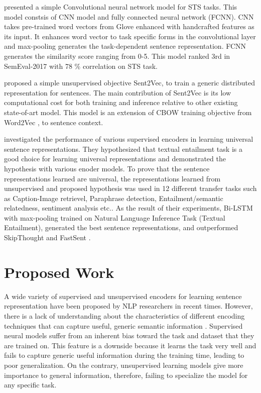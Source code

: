 \documentclass[12pt]{report} %
\begin{document}
\cite{shao2017hcti} presented a simple Convolutional neural network model for STS tasks. This model constsis of CNN model and fully connected neural network (FCNN). CNN takes pre-trained word vectors from Glove \cite{pennington2014glove} enhanced with handcrafted features as its input. It enhances word vector to task specific forms in the convolutional layer and max-pooling generates the task-dependent sentence representation. FCNN generates the similarity score ranging from 0-5. This model ranked 3rd in SemEval-2017 with 78 \% correlation on STS task. 


\cite{pagliardini2017unsupervised} proposed a simple unsupervised objective Sent2Vec, to train a generic distributed representation for sentences. The main contribution of Sent2Vec is its low computational cost for both training and inference relative to other existing state-of-art model. This model is an extension of CBOW training objective from Word2Vec \citep{mikolov2014word2vec}, to sentence context.


\cite{conneau2017supervised} investigated the performance of various supervised encoders in learning universal sentence representations. They hypothesized that textual entailment task is a good choice for learning universal representations and demonstrated the hypothesis with various enoder models. To prove that the sentence representations learned are universal, the representations learned from unsupervised and proposed hypothesis was used in 12 different transfer tasks such as Caption-Image retrievel, Paraphrase detection, Entailment/semantic relatedness, sentiment analysis etc.. As the result of their experiments, Bi-LSTM with max-pooling trained on Natural Language Inference Task (Textual Entailment), generated the best sentence representations, and outperformed SkipThought \cite{kiros2015skip} and FastSent \cite{hill2016learning}.

\chapter{Proposed Work}

A wide variety of supervised and unsupervised encoders for learning sentence representation have been proposed by NLP researchers in recent times. However, there is a lack of understanding about the characteristics of different encoding techniques that can capture useful, generic semantic information \citep{conneau2017supervised}. Supervised neural models suffer from an inherent bias toward the task and dataset that they are trained on.
This feature is a downside because it learns the task very well and fails to capture generic useful information during the training time, leading to poor generalization. On the contrary, unsupervised learning models give more importance to general information, therefore, failing to specialize the model for any specific task. 
\end{document}
